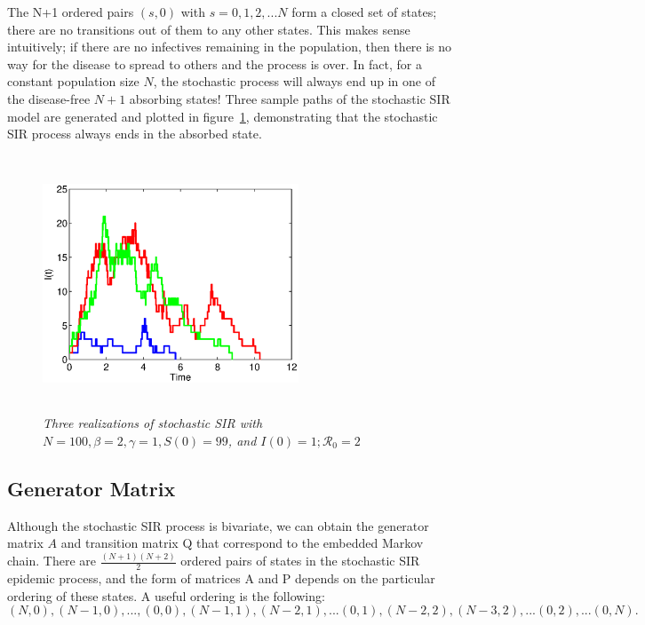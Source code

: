 \documentclass[reqno,11pt]{amsart}
\begin{document}
The N+1 ordered pairs $(s,0)$ with $ s = 0, 1,2,...N $ form a closed set of states; there are no transitions out of them to any other states. This makes sense intuitively; if there are no infectives remaining in the population, then there is no way for the disease to spread to others and the process is over. In fact, for a constant population size $N$, the stochastic process will always end up in one of the disease-free $N+1$ absorbing states! Three sample paths of the stochastic SIR model are generated and plotted in figure~\ref{fig:SIRGillespie}, demonstrating that the stochastic SIR process always ends in the absorbed state.

\begin{figure} 
\begin{center} 
\includegraphics[height=3in,width=3in,angle=0]{Fig_SIR_Gillespie.eps} 
\caption{\small \sl Three realizations of stochastic SIR with $N=100, \beta = 2, \gamma = 1, S(0)=99$, and $I(0)=1; \mathcal R_0 = 2$\label{fig:SIRGillespie}}
\end{center} 
\end{figure}  
%
%
%
%
\subsection{Generator Matrix}
Although the stochastic SIR process is bivariate, we can obtain the generator matrix $A$ and transition matrix Q that correspond to the embedded Markov chain. There are $\frac{(N+1)(N+2)}{2}$ ordered pairs of states in the stochastic SIR epidemic process, and the form of matrices A and P depends on the particular ordering of these states. A useful ordering is the following:
\begin{equation}\label{StochSIR_order}
(N,0), (N-1,0),...,(0,0),(N-1,1),(N-2,1),...(0,1), (N-2,2),(N-3,2),...(0,2),...(0,N).
\end{equation}
\end{document}
